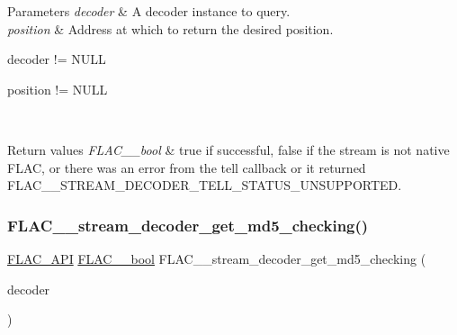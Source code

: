 \begin{DoxyParams}{Parameters}
{\em decoder} & A decoder instance to query. \\
\hline
{\em position} & Address at which to return the desired position.  
\begin{DoxyCode}
decoder != NULL 
\end{DoxyCode}
 
\begin{DoxyCode}
position != NULL 
\end{DoxyCode}
 \\
\hline
\end{DoxyParams}

\begin{DoxyRetVals}{Return values}
{\em F\+L\+A\+C\+\_\+\+\_\+bool} & {\ttfamily true} if successful, {\ttfamily false} if the stream is not native F\+L\+AC, or there was an error from the \textquotesingle{}tell\textquotesingle{} callback or it returned {\ttfamily F\+L\+A\+C\+\_\+\+\_\+\+S\+T\+R\+E\+A\+M\+\_\+\+D\+E\+C\+O\+D\+E\+R\+\_\+\+T\+E\+L\+L\+\_\+\+S\+T\+A\+T\+U\+S\+\_\+\+U\+N\+S\+U\+P\+P\+O\+R\+T\+ED}. \\
\hline
\end{DoxyRetVals}
\mbox{\label{group__flac__stream__decoder_ga3b19d2a761ea61cc57b12e31a5c1adf6}} 
\subsubsection{\texorpdfstring{F\+L\+A\+C\+\_\+\+\_\+stream\+\_\+decoder\+\_\+get\+\_\+md5\+\_\+checking()}{FLAC\_\_stream\_decoder\_get\_md5\_checking()}}
{\footnotesize\ttfamily \hyperlink{group__flac__export_ga56ca07df8a23310707732b1c0007d6f5}{F\+L\+A\+C\+\_\+\+A\+PI} \hyperlink{ordinals_8h_a95103469f1cbd78b8cf250194985b34e}{F\+L\+A\+C\+\_\+\+\_\+bool} F\+L\+A\+C\+\_\+\+\_\+stream\+\_\+decoder\+\_\+get\+\_\+md5\+\_\+checking (\begin{DoxyParamCaption}\item[{\hyperlink{zconf_8h_a2c212835823e3c54a8ab6d95c652660e}{const} \hyperlink{struct_f_l_a_c_____stream_decoder}{F\+L\+A\+C\+\_\+\+\_\+\+Stream\+Decoder} $\ast$}]{decoder }\end{DoxyParamCaption})}

